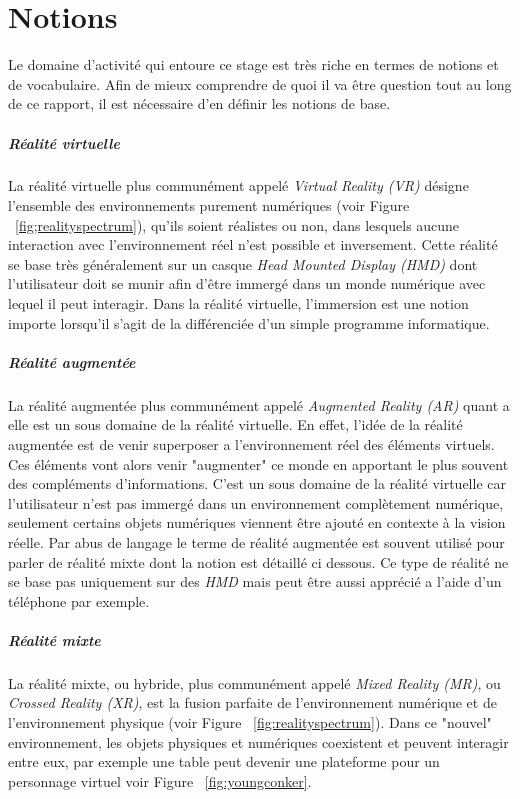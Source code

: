 \newpage
\chapter{Notions}
\label{chap:notions}

Le domaine d'activité qui entoure ce stage est très riche en termes de notions et de vocabulaire. Afin de mieux comprendre de quoi il va être question tout au long de ce rapport, il est nécessaire d'en définir les notions de base.

\paragraph{Réalité virtuelle}
La réalité virtuelle plus communément appelé \emph{Virtual Reality (VR)} désigne l'ensemble des environnements purement numériques (voir Figure ~\ref{fig;realityspectrum}), qu'ils soient réalistes ou non, dans lesquels aucune interaction avec l'environnement réel n'est possible et inversement. Cette réalité se base très généralement sur un casque \emph{Head Mounted Display (HMD)} dont l'utilisateur doit se munir afin d'être immergé dans un monde numérique avec lequel il peut interagir. Dans la réalité virtuelle, l'immersion est une notion importe lorsqu'il s'agit de la différenciée d'un simple programme informatique.

\paragraph{Réalité augmentée}
La réalité augmentée plus communément appelé \emph{Augmented Reality (AR)} quant a elle est un sous domaine de la réalité virtuelle. En effet, l'idée de la réalité augmentée est de venir superposer a l'environnement réel des éléments virtuels. Ces éléments vont alors venir "augmenter" ce monde en apportant le plus souvent des compléments d'informations. C'est un sous domaine de la réalité virtuelle car l'utilisateur n'est pas immergé dans un environnement complètement numérique, seulement certains objets numériques viennent être ajouté en contexte à la vision réelle. Par abus de langage le terme de réalité augmentée est souvent utilisé pour parler de réalité mixte dont la notion est détaillé ci dessous.
Ce type de réalité ne se base pas uniquement sur des \emph{HMD} mais peut être aussi apprécié a l'aide d'un téléphone par exemple.

\paragraph{Réalité mixte}
La réalité mixte, ou hybride, plus communément appelé \emph{Mixed Reality (MR)}, ou \emph{Crossed Reality (XR)}, est la fusion parfaite de l'environnement numérique et de l'environnement physique (voir Figure ~\ref{fig:realityspectrum}). Dans ce "nouvel" environnement, les objets physiques et numériques coexistent et peuvent interagir entre eux, par exemple une table peut devenir une plateforme pour un personnage virtuel voir Figure ~\ref{fig:youngconker}.

